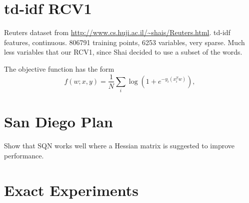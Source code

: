 \documentclass[12pt]{article}
\begin{document}


\section{td-idf RCV1}

Reuters dataset from \url{http://www.cs.huji.ac.il/~shais/Reuters.html}.
td-idf features, continuous.
806791 training points, 6253 variables, very sparse.
Much less variables that our RCV1, since Shai decided to use a subset of the words. 

The objective function has the form 
\begin{equation}
	f(w;x,y) = \frac{1}{N} \sum_i \log \left( 1 + e^{-y_i(x_i^T w)}\right),
\end{equation}


\section{San Diego Plan}

Show that SQN works well where a Hessian matrix is suggested to improve performance. 



\section{Exact Experiments}
\end{document}
